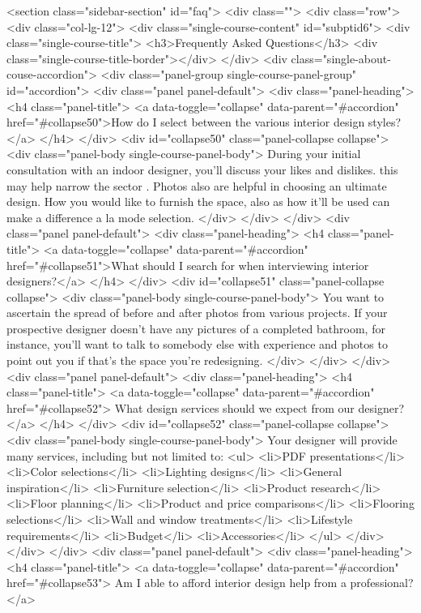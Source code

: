 {<section class="sidebar-section" id="faq">
<div class="">
<div class="row">
<div class="col-lg-12">
<div class="single-course-content" id="subptid6">
<div class="single-course-title">
<h3>Frequently Asked Questions</h3>
<div class="single-course-title-border"></div>
</div>
<div class="single-about-couse-accordion">
<div class="panel-group single-course-panel-group" id="accordion">
<div class="panel panel-default">
<div class="panel-heading">
<h4 class="panel-title">
<a data-toggle="collapse" data-parent="#accordion" href="#collapse50">How do I select between the various interior design styles?</a>
</h4>
</div>
<div id="collapse50" class="panel-collapse collapse">
<div class="panel-body single-course-panel-body">
During your initial consultation with an indoor designer, you'll discuss your likes and dislikes. this may help narrow the sector . Photos also are helpful in choosing an ultimate design. How you would like to furnish the space, also as how it'll be used can make a difference a la mode selection.
</div>
</div>
</div>
<div class="panel panel-default">
<div class="panel-heading">
<h4 class="panel-title">
<a data-toggle="collapse" data-parent="#accordion" href="#collapse51">What should I search for when interviewing interior designers?</a>
</h4>
</div>
<div id="collapse51" class="panel-collapse collapse">
<div class="panel-body single-course-panel-body">
You want to ascertain the spread of before and after photos from various projects. If your prospective designer doesn't have any pictures of a completed bathroom, for instance, you'll want to talk to somebody else with experience and photos to point out you if that's the space you're redesigning.
</div>
</div>
</div>
<div class="panel panel-default">
<div class="panel-heading">
<h4 class="panel-title">
<a data-toggle="collapse" data-parent="#accordion" href="#collapse52"> What design services should we expect from our designer?</a>
</h4>
</div>
<div id="collapse52" class="panel-collapse collapse">
<div class="panel-body single-course-panel-body">
Your designer will provide many services, including but not limited to:
<ul>
<li>PDF presentations</li>
<li>Color selections</li>
<li>Lighting designs</li>
<li>General inspiration</li>
<li>Furniture selection</li>
<li>Product research</li>
<li>Floor planning</li>
<li>Product and price comparisons</li>
<li>Flooring selections</li>
<li>Wall and window treatments</li>
<li>Lifestyle requirements</li>
<li>Budget</li>
<li>Accessories</li>
</ul>
</div>
</div>
</div>
<div class="panel panel-default">
<div class="panel-heading">
<h4 class="panel-title">
<a data-toggle="collapse" data-parent="#accordion" href="#collapse53"> Am I able to afford interior design help from a professional?</a>
}
